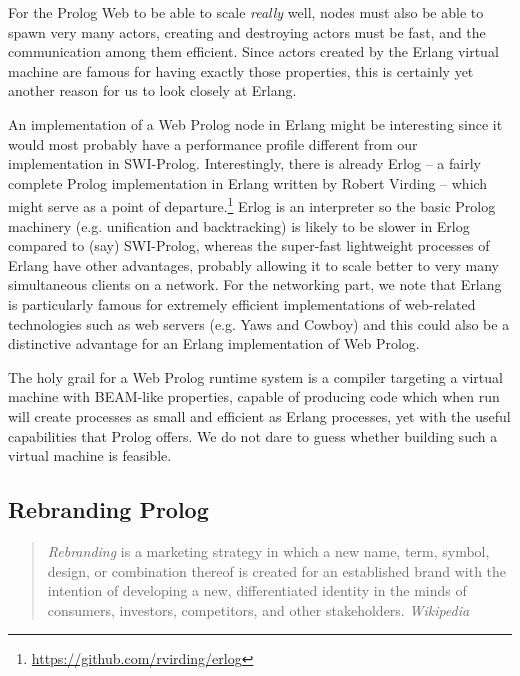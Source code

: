 \documentclass{tlp}
\begin{document}
For the Prolog Web to be able to scale \textit{really} well, nodes must also be able to spawn very many actors, creating and destroying actors must be fast, and the communication among them efficient. Since actors created by the Erlang virtual machine are famous for having exactly those properties, this is certainly yet another reason for us to look closely at Erlang.

An implementation of a Web Prolog node in Erlang might be interesting since it would most probably have a performance profile different from our implementation in SWI-Prolog. Interestingly, there is already Erlog -- a fairly complete Prolog implementation in Erlang written by Robert Virding -- which might serve as a point of departure.\footnote{\url{https://github.com/rvirding/erlog}} Erlog is an interpreter so the basic Prolog machinery (e.g. unification and backtracking) is likely to be slower in Erlog compared to (say) SWI-Prolog, whereas the super-fast lightweight processes of Erlang have other advantages, probably allowing it to scale better to very many simultaneous clients on a network. For the networking part, we note that Erlang is particularly famous for extremely efficient implementations of web-related technologies such as web servers (e.g. Yaws and Cowboy) and this could also be a distinctive advantage for an Erlang implementation of Web Prolog. 

The holy grail for a Web Prolog runtime system is a compiler targeting a virtual machine with BEAM-like properties, capable of producing code which when run will create processes as small and efficient as Erlang processes, yet with the useful capabilities that Prolog offers. We do not dare to guess whether building such a virtual machine is feasible.


\subsection{Rebranding Prolog}\label{sec:for-erlangers}

\begin{quote}
\textit{Rebranding} is a marketing strategy in which a new name, term, symbol, design, or combination thereof is created for an established brand with the intention of developing a new, differentiated identity in the minds of consumers, investors, competitors, and other stakeholders. \textit{Wikipedia}
\end{quote}
\end{document}
